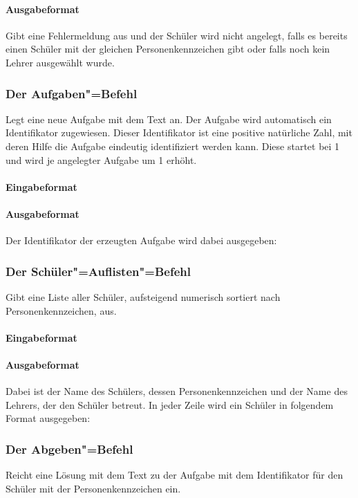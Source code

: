 \documentclass{sdqassignment}
\begin{document}
\paragraph{Ausgabeformat}
Gibt eine Fehlermeldung aus und der Schüler wird nicht angelegt, falls es bereits einen Schüler mit der gleichen Personenkennzeichen gibt oder falls noch kein Lehrer ausgewählt wurde.

\subsubsection{Der Aufgaben"=Befehl}
Legt eine neue Aufgabe mit dem Text  an. Der Aufgabe wird automatisch ein Identifikator zugewiesen. Dieser Identifikator ist eine positive natürliche Zahl, mit deren Hilfe die Aufgabe eindeutig identifiziert werden kann. Diese startet bei 1 und wird je angelegter Aufgabe um 1 erhöht.
\paragraph{Eingabeformat}
\paragraph{Ausgabeformat}
Der Identifikator  der erzeugten Aufgabe wird dabei ausgegeben: 

\subsubsection{Der Schüler"=Auflisten"=Befehl}
Gibt eine Liste aller Schüler, aufsteigend numerisch sortiert nach Personenkennzeichen, aus.
\paragraph{Eingabeformat}
\paragraph{Ausgabeformat}
Dabei ist  der Name des Schülers,  dessen Personenkennzeichen und  der Name des Lehrers, der den Schüler betreut. In jeder Zeile wird ein Schüler in folgendem Format ausgegeben:


\subsubsection{Der Abgeben"=Befehl}
Reicht eine Lösung mit dem Text  zu der Aufgabe mit dem Identifikator  für den Schüler mit der Personenkennzeichen  ein.
\end{document}
